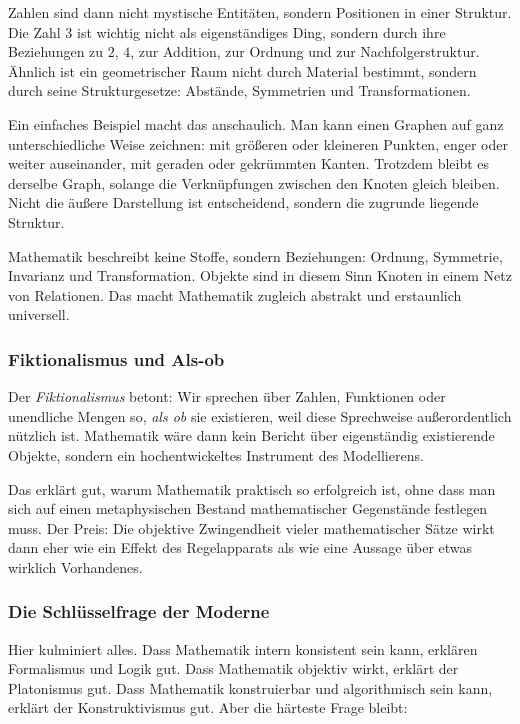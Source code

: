 Zahlen sind dann nicht mystische Entitäten,
sondern Positionen in einer Struktur.
Die Zahl \(3\) ist wichtig nicht als eigenständiges Ding,
sondern durch ihre Beziehungen zu \(2\),
\(4\),
zur Addition,
zur Ordnung
und zur Nachfolgerstruktur.
Ähnlich ist ein geometrischer Raum nicht durch Material bestimmt,
sondern durch seine Strukturgesetze:
Abstände,
Symmetrien
und Transformationen.

Ein einfaches Beispiel macht das anschaulich.
Man kann einen Graphen auf ganz unterschiedliche Weise zeichnen:
mit größeren oder kleineren Punkten,
enger oder weiter auseinander,
mit geraden oder gekrümmten Kanten.
Trotzdem bleibt es derselbe Graph,
solange die Verknüpfungen zwischen den Knoten gleich bleiben.
Nicht die äußere Darstellung ist entscheidend,
sondern die zugrunde liegende Struktur.

\begin{NoteBox}
	\label{box:strukturalistischer-kern}
	\small
	Mathematik beschreibt keine Stoffe,
	sondern Beziehungen:
	Ordnung,
	Symmetrie,
	Invarianz
	und Transformation.
	Objekte sind in diesem Sinn Knoten
	in einem Netz von Relationen.
	Das macht Mathematik zugleich abstrakt
	und erstaunlich universell.
\end{NoteBox}

\subsubsection*{Fiktionalismus und Als-ob}

Der \emph{Fiktionalismus} betont:
Wir sprechen über Zahlen,
Funktionen oder unendliche Mengen so,
\emph{als ob} sie existieren,
weil diese Sprechweise außerordentlich nützlich ist.
Mathematik wäre dann kein Bericht
über eigenständig existierende Objekte,
sondern ein hochentwickeltes Instrument des Modellierens.

Das erklärt gut,
warum Mathematik praktisch so erfolgreich ist,
ohne dass man sich auf einen metaphysischen Bestand mathematischer Gegenstände festlegen muss.
Der Preis:
Die objektive Zwingendheit vieler mathematischer Sätze wirkt dann eher wie ein Effekt des Regelapparats
als wie eine Aussage über etwas wirklich Vorhandenes.

\subsubsection*{Die Schlüsselfrage der Moderne}

Hier kulminiert alles.
Dass Mathematik intern konsistent sein kann,
erklären Formalismus und Logik gut.
Dass Mathematik objektiv wirkt,
erklärt der Platonismus gut.
Dass Mathematik konstruierbar und algorithmisch sein kann,
erklärt der Konstruktivismus gut.
Aber die härteste Frage bleibt:

